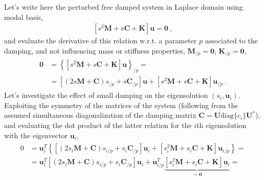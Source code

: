 \documentclass[letterpaper,10pt,english]{jupyterBook}
\begin{document}
\sphinxAtStartPar
Let’s write here the perturbed free damped system in Laplace domain using modal basis,
\begin{equation*}
\begin{split}\left[ s^2 \mathbf{M} + s \mathbf{C} + \mathbf{K} \right] \mathbf{u} = \mathbf{0} \ ,\end{split}
\end{equation*}
\sphinxAtStartPar
and evaluate the derivative of this relation w.r.t. a parameter \(p\) associated to the damping, and not influencing mass or stiffness properties, \(\mathbf{M}_{/p} = \mathbf{0}\), \(\mathbf{K}_{/p} = \mathbf{0}\),
\begin{equation*}
\begin{split}\begin{aligned}
  \mathbf{0} 
  & = \left\{ \left[ s^2 \mathbf{M} + s \mathbf{C} + \mathbf{K} \right] \mathbf{u} \right\}_{/p} = \\
  & = \left[ (2 s \mathbf{M} + \mathbf{C} ) s_{/p} + s \mathbf{C}_{/p} \right] \mathbf{u}
    + \left[ s^2 \mathbf{M} + s \mathbf{C} + \mathbf{K} \right] \mathbf{u}_{/p} \ .
\end{aligned}\end{split}
\end{equation*}
\sphinxAtStartPar
Let’s investigate the effect of small damping on the eigensolution \(\left(s_i, \mathbf{u}_i \right)\). Exploiting the symmetry of the matrices of the system (following from the assumed simultaneous diagonalization of the damping matrix \(\mathbf{C} = \mathbf{U} \text{diag}\{ c_i \} \mathbf{U}^*\)), and evaluating the dot product of the latter relation for the \(i\)\sphinxhyphen{}th eigensolution with the eigenvector \(\mathbf{u}_i\),
\begin{equation*}
\begin{split}\begin{aligned}
  0 & = \mathbf{u}_i^T \left\{ \left[ (2 s_i \mathbf{M} + \mathbf{C} ) s_{i/p} + s_i \mathbf{C}_{/p} \right] \mathbf{u}_i
      + \left[ s_i^2 \mathbf{M} + s_i \mathbf{C} + \mathbf{K} \right] \mathbf{u}_{i/p} \right\} = \\
    & = \mathbf{u}_i^T \left[ (2 s_i \mathbf{M} + \mathbf{C} ) s_{i/p} + s_i \mathbf{C}_{/p} \right] \mathbf{u}_i
      + \mathbf{u}_{i/p}^T \underbrace{\left[ s_i^2 \mathbf{M} + s_i \mathbf{C} + \mathbf{K} \right] \mathbf{u}_i}_{=\mathbf{0}} = \\
\end{aligned}\end{split}
\end{equation*}
\end{document}
